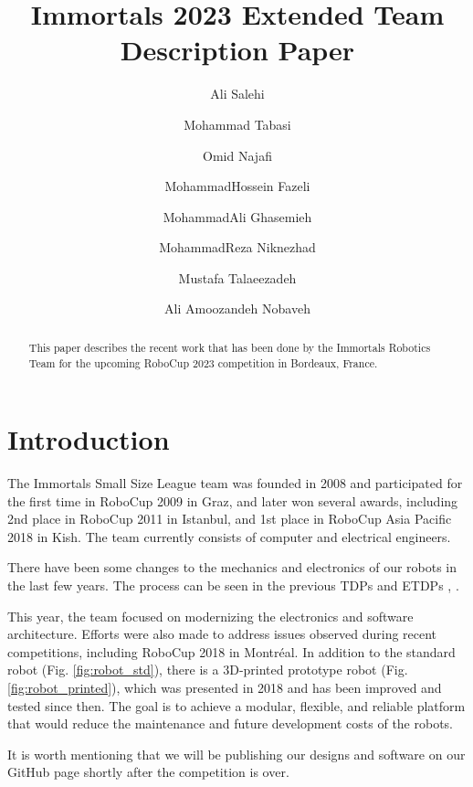\documentclass[runningheads]{llncs}
\begin{document}
%
\title{Immortals 2023 Extended Team Description Paper}

\author{Ali Salehi \and
Mohammad Tabasi \and
Omid Najafi \and
MohammadHossein Fazeli \and
MohammadAli Ghasemieh \and
MohammadReza Niknezhad \and
Mustafa Talaeezadeh \and
Ali Amoozandeh Nobaveh}
%
%
%
\maketitle              %
%
\begin{abstract}
This paper describes the recent work that has been done by the Immortals Robotics Team for the upcoming RoboCup 2023 competition in Bordeaux, France.

\end{abstract}
%
%
%
\section{Introduction}
The Immortals Small Size League team was founded in 2008 and participated for the first time in RoboCup 2009 in Graz, and later won several awards, including 2nd place in RoboCup 2011 in Istanbul, and 1st place in RoboCup Asia Pacific 2018 in Kish. The team currently consists of computer and electrical engineers.

There have been some changes to the mechanics and electronics of our robots in the last few years. The process can be seen in the previous TDPs and ETDPs \cite{ref_ETDP2019}, \cite{ref_ETDP2020}.
 
This year, the team focused on modernizing the electronics and software architecture. Efforts were also made to address issues observed during recent competitions, including RoboCup 2018 in Montréal. In addition to the standard robot (Fig. \ref{fig:robot_std}), there is a 3D-printed prototype robot (Fig. \ref{fig:robot_printed}), which was presented in 2018 and has been improved and tested since then. The goal is to achieve a modular, flexible, and reliable platform that would reduce the maintenance and future development costs of the robots.

It is worth mentioning that we will be publishing our designs and software on our GitHub page \cite{ref_github} shortly after the competition is over.
\end{document}
